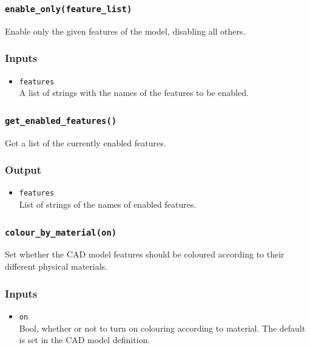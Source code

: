 \documentclass[12pt]{article}
\newcommand{\code}[1]{\texttt{#1}}
\begin{document}
\subsubsection*{\code{enable\_only(feature\_list)}}
\begin{adjustwidth}{0.5cm}{0cm}
Enable only the given features of the model, disabling all others.
\subsubsection*{Inputs}
\begin{itemize}
\item{\code{features}\\A list of strings with the names of the features to be enabled.}
\end{itemize}
\end{adjustwidth}
\subsubsection*{\code{get\_enabled\_features()}}
\begin{adjustwidth}{0.5cm}{0cm}
Get a list of the currently enabled features.
\subsubsection*{Output}
\begin{itemize}
\item{\code{features}\\List of strings of the names of enabled features.}
\end{itemize}
\end{adjustwidth}
\subsubsection*{\code{colour\_by\_material(on)}}
\begin{adjustwidth}{0.5cm}{0cm}
Set whether the CAD model features should be coloured according to their different physical materials.
\subsubsection*{Inputs}
\begin{itemize}
\item{\code{on}\\Bool, whether or not to turn on colouring according to material. The default is set in the CAD model definition.}
\end{itemize}
\end{adjustwidth}
\end{document}
